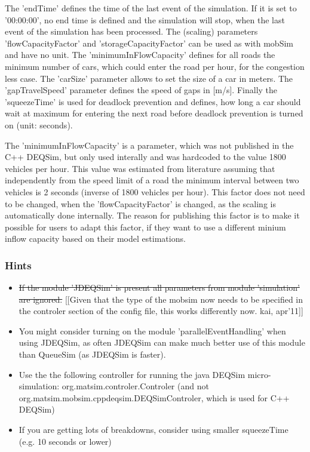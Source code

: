 \documentclass[a4paper,11pt]{report}
\begin{document}
The  'endTime' defines the time of the last event of the simulation. If it is  set to '00:00:00', no end time is defined and the simulation will stop,  when the last event of the simulation has been processed. The (scaling)  parameters  'flowCapacityFactor' and 'storageCapacityFactor' can  be used as with mobSim and have no unit. The 'minimumInFlowCapacity'  defines for all roads the minimum number of cars, which could enter the  road per hour, for the congestion less case. The 'carSize' parameter  allows to set the size of a car in meters. The 'gapTravelSpeed'  parameter defines the speed of gaps in [m/s]. Finally the 'squeezeTime'  is used for deadlock prevention and defines, how long a car should wait  at maximum for entering the next road before deadlock prevention is  turned on (unit: seconds).

The 'minimumInFlowCapacity' is a  parameter, which was not published in the C++ DEQSim, but only used  interally and was hardcoded to the value 1800 vehicles per hour. This  value was estimated from literature assuming that independently from the  speed limit of a road the minimum interval between two vehicles is 2  seconds (inverse of 1800 vehicles per hour). This factor does not need  to be changed, when the 'flowCapacityFactor' is changed, as the scaling  is automatically done internally. The reason for publishing this factor  is to make it possible for users to adapt this factor, if they want to  use a different minium inflow capacity based on their model estimations.

\subsubsection{Hints}
\begin{itemize}
	\item \sout{If the module 'JDEQSim' is present all parameters from module 'simulation' are ignored.}  [[Given that the type of the mobsim now needs to be specified in the  controler section of the config file, this works differently now.  kai, apr'11]]
	\item You might consider turning on the module  'parallelEventHandling' when using JDEQSim, as often JDEQSim can make  much better use of this module than QueueSim (as JDEQSim is faster).
	\item Use  the the following controller for running the java DEQSim  micro-simulation: org.matsim.controler.Controler (and not  org.matsim.mobsim.cppdeqsim.DEQSimControler, which is used for C++  DEQSim)
\\
	\item If you are getting lots of breakdowns, consider using smaller squeezeTime (e.g. 10 seconds or lower)
\end{itemize}
\end{document}
